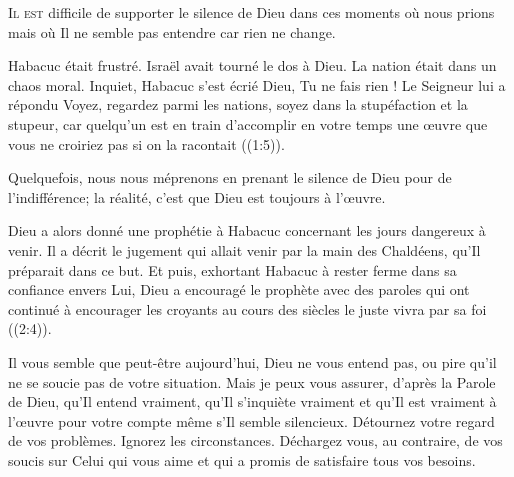 \lettrine{I}{l est} difficile de supporter le silence de Dieu
 \ocadr dans ces moments où nous prions mais où Il ne semble pas
 entendre car rien ne change. 

Habacuc était frustré. Israël avait tourné le dos à Dieu.
 La nation était dans un chaos moral. Inquiet, Habacuc s'est écrié\frcolon{} 
 \Og Dieu, Tu ne fais rien ! \Fg{} 
 Le Seigneur lui a répondu\frcolon{} \Og Voyez, regardez parmi les nations,
 soyez dans la stupéfaction et la stupeur, car quelqu'un est en train
 d'accomplir en votre temps une \oe{}uvre que vous ne croiriez pas
 si on la racontait \Fg{} ((1:5)).


Quelquefois, nous nous méprenons en prenant le silence de Dieu
 pour de l'indifférence; la réalité, c'est que Dieu est toujours à l'\oe{}uvre. 

Dieu a alors donné une prophétie à Habacuc concernant les jours dangereux
 à venir. Il a décrit le jugement qui allait venir par la main des Chaldéens,
 qu'Il préparait dans ce but. Et puis, exhortant Habacuc à rester ferme
 dans sa confiance envers Lui, Dieu a encouragé le prophète avec des paroles
 qui ont continué à encourager les croyants au cours des siècles\frcolon{}
 \Og le juste vivra par sa foi \Fg{} ((2:4)). 

Il vous semble que peut-être aujourd'hui, Dieu ne vous entend pas, ou pire
 \ocadr qu'il ne se soucie pas de votre situation. Mais je peux vous assurer,
 d'après la Parole de Dieu, qu'Il entend vraiment,
 qu'Il s'inquiète vraiment et qu'Il est vraiment à l'\oe{}uvre pour votre compte
 \ocadr même s'Il semble silencieux. Détournez votre regard de vos problèmes.
 Ignorez les circonstances. Déchargez vous, au contraire, de vos soucis
 sur Celui qui vous aime et qui a promis de satisfaire tous vos besoins. 

\dvrule






